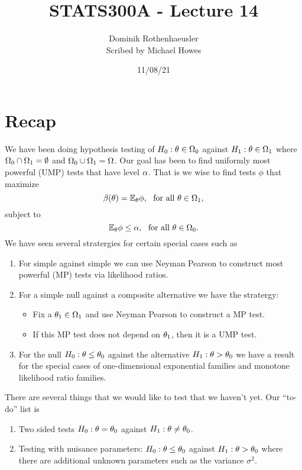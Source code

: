 




\title{STATS300A - Lecture 14}
\author{Dominik Rothenhaeusler\\ Scribed by Michael Howes}
\date{11/08/21}

\pagestyle{fancy}
\fancyhf{}


\maketitle
\tableofcontents
\section{Recap}
We have been doing hypothesis testing of $H_0 : {\theta} \in {{\Omega}}_0$ against $H_1: {\theta} \in {{\Omega}}_1$ where ${{\Omega}}_0 \cap {{\Omega}}_1 = \emptyset$ and ${{\Omega}}_0 \cup {{\Omega}}_1 = {{\Omega}}$. Our goal has been to find uniformly most powerful (UMP) tests that have level ${\alpha}$. That is we wise to find tests $\phi$ that maximize
\[\beta({\theta})= {\mathbb{E}}_{\theta} \phi,~~\text{for all } {\theta} \in {{\Omega}}_1, \]
subject to 
\[{\mathbb{E}}_{\theta} \phi \le {\alpha},~~\text{for all } {\theta} \in {{\Omega}}_0. \]
We have seen several stratergies for certain special cases such as 
\begin{enumerate}
    \item For simple against simple we can use Neyman Pearson to construct most powerful (MP) tests via likelihood ratios.
    \item For a simple null against a composite alternative we have the stratergy:\begin{itemize}
        \item Fix a ${\theta}_1 \in {{\Omega}}_1$ and use Neyman Pearson to construct a MP test.
        \item If this MP test does not depend on ${\theta}_1$, then it is a UMP test.
    \end{itemize}
    \item For the null $H_0 : {\theta} \le {\theta}_0$ against the alternative $H_1 : {\theta} > {\theta}_0$ we have a result for the special cases of one-dimensional exponential families and monotone likelihood ratio families.
\end{enumerate}
There are several things that we would like to test that we haven't yet. Our ``to-do'' list is
\begin{enumerate}
    \item Two sided tests $H_0 : {\theta} = {\theta}_0$ against $H_1 : {\theta} \neq {\theta}_0$.
    \item Testing with nuisance parameters: $H_0 : {\theta} \le {\theta}_0$ against $H_1 : {\theta} > {\theta}_0$ where there are additional unknown parameters such as the variance $\sigma^2$.
\end{enumerate}
